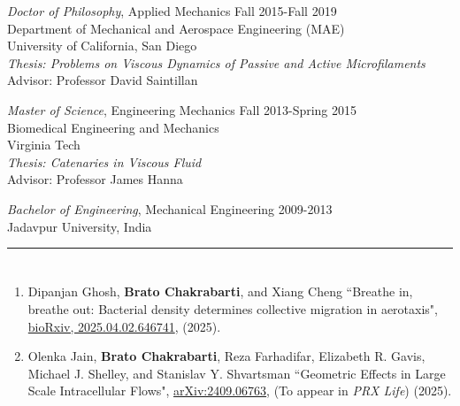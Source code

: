 \documentclass[10pt]{res} %
\begin{document}
\begin{resume}
\vspace*{4mm} %
{\sl Doctor of Philosophy}, 
Applied Mechanics   \hfill Fall 2015-Fall 2019 \\ 
Department of Mechanical and Aerospace Engineering (MAE) \\ 
University of California, San Diego \\
\textit{Thesis: Problems on Viscous Dynamics of Passive and Active Microfilaments} \\
Advisor: Professor David Saintillan 

 
{\sl Master of Science}, Engineering Mechanics \hfill Fall 2013-Spring 2015 \\
Biomedical Engineering and Mechanics \\ 
Virginia Tech \\
\textit{Thesis: Catenaries in Viscous Fluid} \\
Advisor: Professor James Hanna 


{\sl Bachelor of Engineering}, Mechanical Engineering \hfill 2009-2013 \\
Jadavpur University, India 

\vspace*{-3mm}


\noindent\rule{\textwidth}{0.6pt}
\vspace*{-10mm}
\section{}
\vspace*{7mm} %
\begin{enumerate}[topsep=0pt,itemsep= 1ex]
	
\item  Dipanjan Ghosh, \textbf{Brato Chakrabarti}, and Xiang Cheng ``Breathe in, breathe out: Bacterial density determines collective migration in aerotaxis", \href{https://www.biorxiv.org/content/10.1101/2025.04.02.646741v1.abstract}{bioRxiv, 2025.04.02.646741}, (2025).

\item  Olenka Jain, \textbf{Brato Chakrabarti}, Reza Farhadifar, Elizabeth R. Gavis, Michael J. Shelley, and Stanislav Y. Shvartsman ``Geometric Effects in Large Scale Intracellular Flows", \href{https://doi.org/10.48550/arXiv.2409.06763}{arXiv:2409.06763}, (To appear in \textit{PRX Life}) (2025). 


\end{enumerate}
\end{resume}
\end{document}
